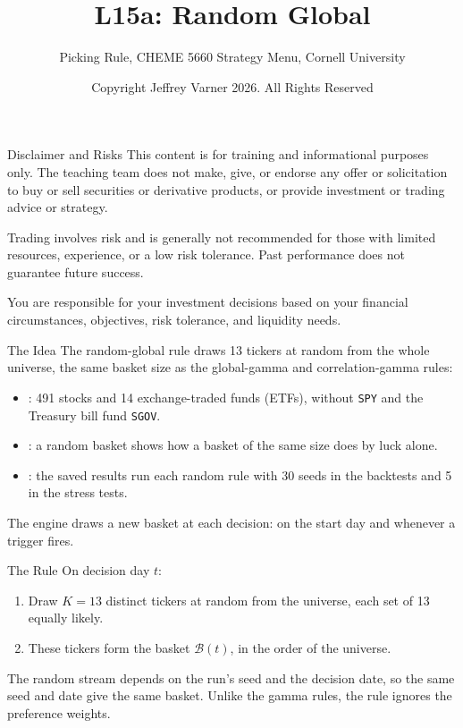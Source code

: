 \documentclass[aspectratio=169,11pt]{beamer}
\title{\texorpdfstring{{\vnheavy L15a}}{L15a}: Random Global}
\subtitle{Picking Rule, CHEME 5660 Strategy Menu, Cornell University}
\author{Copyright Jeffrey Varner 2026. All Rights Reserved}
\begin{document}
\vntitlepage

\begin{frame}{Disclaimer and Risks}
  \vspace{0.6em}
  \textbf{} This content is for training and informational
  purposes only. The teaching team does not make, give, or endorse any offer or
  solicitation to buy or sell securities or derivative products, or provide
  investment or trading advice or strategy.

  \vspace{1.1em}
  \textbf{} Trading involves risk and is generally not recommended for
  those with limited resources, experience, or a low risk tolerance. Past
  performance does not guarantee future success.

  \vspace{1.1em}
  \textbf{} You are responsible for your investment decisions
  based on your financial circumstances, objectives, risk tolerance, and
  liquidity needs.
\end{frame}

\begin{frame}{The Idea}
  \vspace{0.3em}
  The random-global rule draws 13 tickers at random from the whole universe, the same basket size as the
  global-gamma and correlation-gamma rules:
  \begin{itemize}\setlength{\itemsep}{0.5em}
    \item {}: 491 stocks and 14 exchange-traded funds (ETFs), without \texttt{SPY} and the Treasury bill fund \texttt{SGOV}.
    \item {}: a random basket shows how a basket of the same size does by luck alone.
    \item {}: the saved results run each random rule with 30 seeds in the backtests and 5 in the stress tests.
  \end{itemize}

  \vspace{0.5em}
  The engine draws a new basket at each decision: on the start day and whenever a trigger fires.
\end{frame}

\begin{frame}{The Rule}
  \vspace{0.3em}
  On decision day $t$:
  \begin{enumerate}\setlength{\itemsep}{0.5em}
    \item Draw $K=13$ distinct tickers at random from the universe, each set of 13 equally likely.
    \item These tickers form the basket $\mathcal{B}(t)$, in the order of the universe.
  \end{enumerate}

  \vspace{0.5em}
  The random stream depends on the run's seed and the decision date, so the same seed and date give the same basket. Unlike the gamma rules, the rule ignores the preference weights.
\end{frame}
\end{document}
